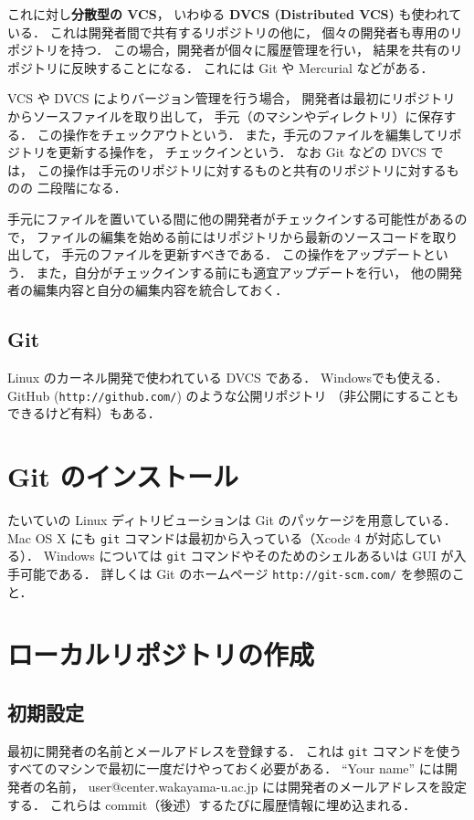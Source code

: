 \documentclass[a4j,10pt]{jarticle}
\begin{document}
これに対し{\bf 分散型の VCS}，
いわゆる {\bf DVCS (Distributed VCS)} も使われている．
これは開発者間で共有するリポジトリの他に，
個々の開発者も専用のリポジトリを持つ．
この場合，開発者が個々に履歴管理を行い，
結果を共有のリポジトリに反映することになる．
これには Git や Mercurial などがある．

VCS や DVCS によりバージョン管理を行う場合，
開発者は最初にリポジトリからソースファイルを取り出して，
手元（のマシンやディレクトリ）に保存する．
この操作をチェックアウトという．
また，手元のファイルを編集してリポジトリを更新する操作を，
チェックインという．
なお Git などの DVCS では，
この操作は手元のリポジトリに対するものと共有のリポジトリに対するものの
二段階になる．

手元にファイルを置いている間に他の開発者がチェックインする可能性があるので，
ファイルの編集を始める前にはリポジトリから最新のソースコードを取り出して，
手元のファイルを更新すべきである．
この操作をアップデートという．
また，自分がチェックインする前にも適宜アップデートを行い，
他の開発者の編集内容と自分の編集内容を統合しておく．

\subsection{Git}
Linux のカーネル開発で使われている DVCS である．
Windowsでも使える．
GitHub (\verb|http://github.com/|) のような公開リポジトリ
（非公開にすることもできるけど有料）もある．

\section{Git のインストール}
たいていの Linux ディトリビューションは Git のパッケージを用意している．
Mac OS X にも \verb|git| コマンドは最初から入っている（Xcode 4 が対応している）．
Windows については \verb|git| コマンドやそのためのシェルあるいは GUI が入手可能である．
詳しくは Git のホームページ \verb|http://git-scm.com/| を参照のこと．

\section{ローカルリポジトリの作成}

\subsection{初期設定}
最初に開発者の名前とメールアドレスを登録する．
これは \verb|git| コマンドを使うすべてのマシンで最初に一度だけやっておく必要がある．
``Your name'' には開発者の名前，
user@center.wakayama-u.ac.jp には開発者のメールアドレスを設定する．
これらは commit（後述）するたびに履歴情報に埋め込まれる．
\end{document}
